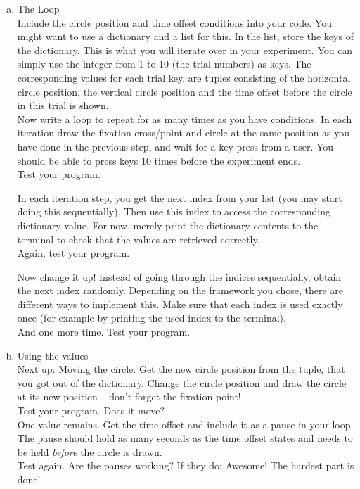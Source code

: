 \begin{enumerate}[a)]
\item The Loop\\
Include the circle position and time offset conditions into your code. You might
want to use a dictionary and a list for this. In the list, store the keys
of the dictionary. This is what you will iterate over in your experiment.
You can simply use the integer from 1 to 10 (the trial numbers) as keys.
The corresponding values for each trial key, are tuples consisting of 
the horizontal circle position, the vertical circle position and the time
offset before the circle in this trial is shown.\\
Now write a loop to repeat for as many times as you have conditions. In each
iteration draw the fixation cross/point and circle at the same position as 
you have done in the previous step, and wait for a key press from a user.
You should be able to press keys 10 times before the experiment ends.\\
Test your program.

\noindent In each iteration step, you get the next index from your list (you
may start doing this sequentially). Then use this index to access the corresponding
dictionary value. For now, merely print the dictionary contents to the terminal to
check that the values are retrieved correctly.\\
Again, test your program.

\noindent Now change it up! Instead of going through the indices sequentially,
obtain the next index randomly. Depending on the framework you chose, there are
different ways to implement this. Make sure that each index is used exactly once
(for example by printing the used index to the terminal).\\
And one more time. Test your program.

\item Using the values\\
Next up: Moving the circle. Get the new circle position from the tuple, that you
got out of the dictionary. Change the circle position and draw the circle at its
new position -- don't forget the fixation point!\\
Test your program. Does it move?\\
One value remains. Get the time offset and include it as a pause in your loop.
The pause should hold as many seconds as the time offset states and needs to 
be held \textit{before} the circle is drawn.\\
Test again. Are the pauses working? If they do: Awesome! The hardest part is done!


\end{enumerate}
